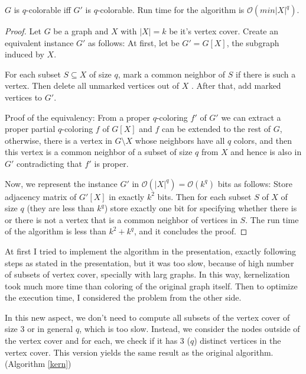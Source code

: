 \documentclass{beamer}
\begin{document}
{\begin{defi}
\begin{theorem}{\label{main theorem}}
$G$ is $q$-colorable iff $G'$ is $q$-colorable. Run time for the algorithm
is $\mathcal{O}(min|X|^q)$.
\end{theorem}

\begin{proof}
Let $G$ be a graph and $X$ with $|X| = k$ be it's vertex cover. Create an
equivalent instance $G'$ as follows: At first, let be $G' = G[X]$,  the subgraph induced by $X$. 

For each subset
$S \subseteq X$ of size $q$, mark a common neighbor of $S$ if there is such a vertex.
Then delete all unmarked vertices out of $X$ . After that, add marked vertices to $G'$. 

Proof of the equivalency: From a proper $q$-coloring $f'$ of $G'$ we
can extract a proper partial $q$-coloring $f$ of $G[X]$ and $f$ can be extended to the rest of $G$, otherwise, there is a vertex in $G \setminus X$ whose neighbors have all $q$ colors, and then this vertex is a common neighbor of a subset of size $q$ from
$X$ and hence is also in $G'$ contradicting that $f'$ is proper.

Now, we represent the instance $G'$ in $\mathcal{O}(|X|^q) = \mathcal{O}(k^q)$ bits as follows: Store 
adjacency matrix of $G'[X]$ in exactly $k^2$ bits. Then for each subset $S$ of $X$ 
of size $q$ (they are less than $k^q$) store exactly one bit for specifying whether 
there is or there is not a vertex that is a common neighbor of vertices in $S$. The 
run time of the algorithm is less than $k^2 + k^q$, and it concludes the proof.
\end{proof}
\vspace{1cm}

At first I tried to implement the algorithm in the presentation, exactly following steps as stated in the presentation, but it was too slow, because of high number of subsets of vertex cover, specially with larg graphs. In this way, kernelization took much more time than coloring of the original graph itself. Then to optimize the execution time, I considered the problem from the other side. 

In this new aspect, we don't need to compute all subsets of the vertex cover of size $3$ or in general $q$, which is too slow. Instead, we consider the nodes outside of the vertex cover and for each, we check if it has $3$ ($q$) distinct vertices in the vertex cover. This version yields the same result as the original algorithm. (Algorithm \ref{kern})


\end{defi}}
\end{document}
